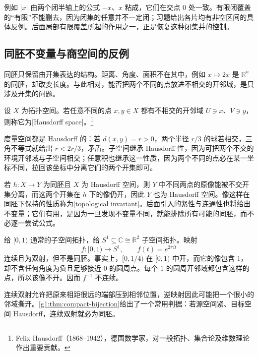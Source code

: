 例如 \(|x|\) 由两个闭半轴上的公式 \(-x\)、\(x\) 粘成，它们在交点 \(0\) 处一致。有限闭覆盖的“有限”不能删去，因为闭集的任意并不一定闭；习题给出各片均有非空区间的具体反例。后面局部有限覆盖所起的作用之一，正是恢复这种闭集并的控制。

\subsection{同胚不变量与商空间的反例}
\label{g1:subsec:0401:04}

同胚只保留由开集表达的结构。距离、角度、面积不在其中，例如 \(x\mapsto2x\) 是 \(\mathbb R^n\) 的同胚，却改变长度。与此相对，能否把两个不同的点放进不相交的开邻域，是只涉及开集的问题。

\begin{definition}[Hausdorff 空间]\label{g1:def:hausdorff}
	设 \(X\) 为拓扑空间。若任意不同的点 \(x,y\in X\) 都有不相交的开邻域 \(U\ni x\)、\(V\ni y\)，则称它为[Hausdorff space]。\footnote{Felix Hausdorff（1868--1942），德国数学家，对一般拓扑、集合论及维数理论作出重要贡献。}
\end{definition}

度量空间都是 Hausdorff 的：若 \(d(x,y)=r>0\)，两个半径 \(r/3\) 的球若相交，三角不等式就给出 \(r<2r/3\)，矛盾。子空间继承 Hausdorff 性，因为可把两个不交的环境开邻域与子空间相交；任意积也继承这一性质，因为两个不同的点必在某一坐标不同，拉回该坐标中分离它们的两个开集即可。

若 \(h:X\to Y\) 为同胚且 \(X\) 为 Hausdorff 空间，则 \(Y\) 中不同两点的原像能被不交开集分离，而这两个开集在 \(h\) 下的像仍开，因此 \(Y\) 也为 Hausdorff 空间。像这样在同胚下保持的性质称为[topological invariant]。后面引入的紧性与连通性也将给出不变量；它们有用，是因为一旦发现不变量不同，就能排除所有可能的同胚，而不必逐一尝试公式。

\begin{example}\label{g1:exm:half-open-circle}
	给 \([0,1)\) 通常的子空间拓扑，给 \(S^1\subseteq\mathbb C\cong\mathbb R^2\) 子空间拓扑。映射
	\[
		f:[0,1)\longrightarrow S^1,\qquad f(t)=e^{2\pi it}
	\]
	连续且为双射，但不是同胚。事实上，\([0,1/4)\) 在 \([0,1)\) 中开，而它的像包含 \(1\)，却不含任何角度为负且足够接近 \(0\) 的圆周点。每个 \(1\) 的圆周开邻域都包含这样的点，所以该像不开。因而 \(f^{-1}\) 不连续。
\end{example}

连续双射允许把原来相距很远的端部压到相邻位置，逆映射因此可能把一个很小的邻域撕开。\cref{g1:thm:compact-bijection}给出了一个常用判据：若源空间紧、目标空间 Hausdorff，连续双射就必为同胚。

